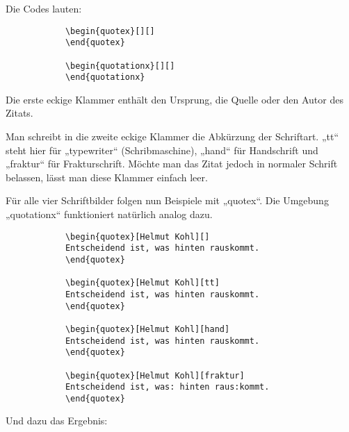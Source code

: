			Die Codes lauten: 
			
			\begin{verbatim}
			\begin{quotex}[][]
			\end{quotex}
			
			\begin{quotationx}[][]
			\end{quotationx}
			\end{verbatim}\newline
			
			Die erste eckige Klammer enthält den Ursprung, die Quelle oder den Autor des Zitats. 
			
			Man schreibt in die zweite eckige Klammer die Abkürzung der Schriftart. „tt“ steht hier für „typewriter“ (Schribmaschine), „hand“ für Handschrift und „fraktur“ für Frakturschrift. Möchte man das Zitat jedoch in normaler Schrift belassen, lässt man diese Klammer einfach leer. 
			
			Für alle vier Schriftbilder folgen nun Beispiele mit „quotex“. Die Umgebung „quotationx“ funktioniert natürlich analog dazu. 
			
			\begin{verbatim}
			\begin{quotex}[Helmut Kohl][]
			Entscheidend ist, was hinten rauskommt.
			\end{quotex}
			
			\begin{quotex}[Helmut Kohl][tt]
			Entscheidend ist, was hinten rauskommt.
			\end{quotex}
			
			\begin{quotex}[Helmut Kohl][hand]
			Entscheidend ist, was hinten rauskommt.
			\end{quotex}
			
			\begin{quotex}[Helmut Kohl][fraktur]
			Entscheidend ist, was: hinten raus:kommt.
			\end{quotex}
			\end{verbatim}\newline
			
			Und dazu das Ergebnis: \newline
			

